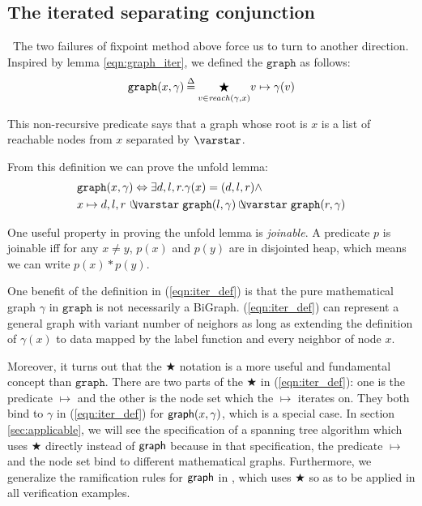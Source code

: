 \subsection{The iterated separating conjunction}\
The two failures of fixpoint method above force us to turn to another
direction. Inspired by lemma \ref{eqn:graph_iter}, we defined the
$\mathtt{graph}$ as follows:
\begin{equation}\label{eqn:iter_def}
  \mathtt{graph}(x, \gamma)\mathbin{\stackrel{\Delta}{=}}\underset{v\in\mathit{reach}(\gamma, x)}{\bigstar} v\mapsto\gamma(v)
\end{equation}

This non-recursive predicate says that a graph whose root is $x$ is a
list of reachable nodes from $x$ separated by $\scon$.

\label{sec:foldunfold} From this definition we can prove the unfold lemma:
\begin{equation*}
  \begin{split}
  & \mathtt{graph}(x, \gamma) \Leftrightarrow \exists d,l,r
    . \gamma(x)=(d,l,r) \wedge \\ & x \mapsto d,l,r\, \ocon
    \mathtt{graph}(l, \gamma) \ocon \mathtt{graph}(r, \gamma)
  \end{split}
\end{equation*}

One useful property in proving the unfold lemma is \emph{joinable}. A
predicate $p$ is joinable iff for any $x\neq y$, $p(x)$ and $p(y)$ are
in disjointed heap, which means we can write $p(x) * p(y)$.

One benefit of the definition in (\ref{eqn:iter_def}) is that the pure
mathematical graph $\gamma$ in $\mathtt{graph}$ is not necessarily a
BiGraph. (\ref{eqn:iter_def}) can represent a general graph with
variant number of neighors as long as extending the definition of
$\gamma(x)$ to data mapped by the label function and every neighbor of
node $x$.

Moreover, it turns out that the $\bigstar$ notation is a more useful
and fundamental concept than $\mathtt{graph}$. There are two parts of
the $\bigstar$ in (\ref{eqn:iter_def}): one is the predicate $\mapsto$
and the other is the node set which the $\mapsto$ iterates on. They
both bind to $\gamma$ in (\ref{eqn:iter_def}) for $\mathsf{graph}(x,
\gamma)$, which is a special case. In section \ref{sec:applicable}, we
will see the specification of a spanning tree algorithm which uses
$\bigstar$ directly instead of $\mathsf{graph}$ because in that
specification, the predicate $\mapsto$ and the node set bind to
different mathematical graphs. Furthermore, we generalize the
ramification rules for $\mathsf{graph}$ in \cite{hobor:ramification}, which
uses $\bigstar$ so as to be applied in all verification examples.

